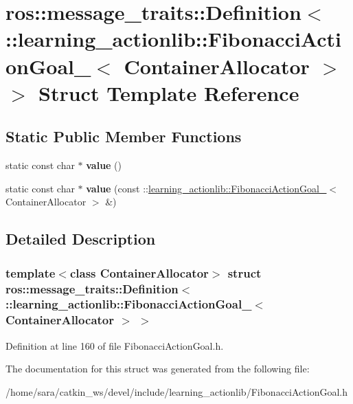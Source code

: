 \hypertarget{structros_1_1message__traits_1_1Definition_3_01_1_1learning__actionlib_1_1FibonacciActionGoal___9189a6b4f027cf7a43458bafe51c99bc}{}\section{ros\+:\+:message\+\_\+traits\+:\+:Definition$<$ \+:\+:learning\+\_\+actionlib\+:\+:Fibonacci\+Action\+Goal\+\_\+$<$ Container\+Allocator $>$ $>$ Struct Template Reference}
\label{structros_1_1message__traits_1_1Definition_3_01_1_1learning__actionlib_1_1FibonacciActionGoal___9189a6b4f027cf7a43458bafe51c99bc}
\subsection*{Static Public Member Functions}
\begin{DoxyCompactItemize}
\item 
\mbox{\label{structros_1_1message__traits_1_1Definition_3_01_1_1learning__actionlib_1_1FibonacciActionGoal___9189a6b4f027cf7a43458bafe51c99bc_ab4686ef66bef21e50fe67663f7115af5}} 
static const char $\ast$ {\bfseries value} ()
\item 
\mbox{\label{structros_1_1message__traits_1_1Definition_3_01_1_1learning__actionlib_1_1FibonacciActionGoal___9189a6b4f027cf7a43458bafe51c99bc_ab9b1eb54e77c81fa5c264c6935eb5705}} 
static const char $\ast$ {\bfseries value} (const \+::\hyperlink{structlearning__actionlib_1_1FibonacciActionGoal__}{learning\+\_\+actionlib\+::\+Fibonacci\+Action\+Goal\+\_\+}$<$ Container\+Allocator $>$ \&)
\end{DoxyCompactItemize}


\subsection{Detailed Description}
\subsubsection*{template$<$class Container\+Allocator$>$\newline
struct ros\+::message\+\_\+traits\+::\+Definition$<$ \+::learning\+\_\+actionlib\+::\+Fibonacci\+Action\+Goal\+\_\+$<$ Container\+Allocator $>$ $>$}



Definition at line 160 of file Fibonacci\+Action\+Goal.\+h.



The documentation for this struct was generated from the following file\+:\begin{DoxyCompactItemize}
\item 
/home/sara/catkin\+\_\+ws/devel/include/learning\+\_\+actionlib/Fibonacci\+Action\+Goal.\+h\end{DoxyCompactItemize}
